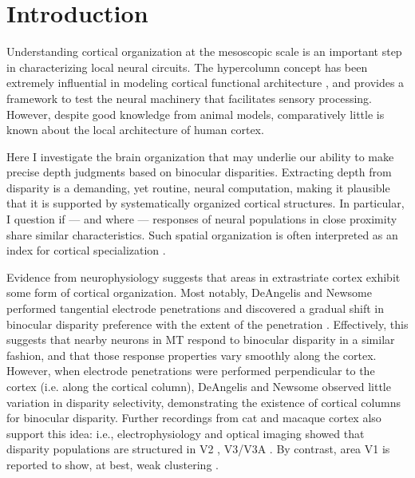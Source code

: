\section{Introduction}

Understanding cortical organization at the mesoscopic scale is an important step in characterizing local neural circuits. The hypercolumn concept \cite{Hubel:1974sv} has been extremely influential in modeling cortical functional architecture \cite{Tso:2009tg}, and provides a framework to test the neural machinery that facilitates sensory processing. However, despite good knowledge from animal models, comparatively little is known about the local architecture of human cortex. 

Here I investigate the brain organization that may underlie our ability to make precise depth judgments based on binocular disparities. Extracting depth from disparity is a demanding, yet routine, neural computation, making it plausible that it is supported by systematically organized cortical structures. In particular, I question if --- and where --- responses of neural populations in close proximity share similar characteristics. Such spatial organization is often interpreted as an index for cortical specialization \cite{DeAngelis:1999fk, Chen:2008vn}.

Evidence from neurophysiology suggests that areas in extrastriate cortex exhibit some form of cortical organization. Most notably, DeAngelis and Newsome performed tangential electrode penetrations and discovered a gradual shift in binocular disparity preference with the extent of the penetration \cite{DeAngelis:1999fk}. Effectively, this suggests that nearby neurons in MT respond to binocular disparity in a similar fashion, and that those response properties vary smoothly along the cortex. However, when electrode penetrations were performed perpendicular to the cortex (i.e. along the cortical column), DeAngelis and Newsome observed little variation in disparity selectivity, demonstrating the existence of cortical columns for binocular disparity. Further recordings from cat and macaque cortex also support this idea: i.e., electrophysiology and optical imaging showed that disparity populations are structured in V2 \cite{Hubel:1987ly,Roe:1995ys,Tso:2001zr,Chen:2008vn,Kara:2009fk}, V3/V3A \cite{Adams:2001wt,Anzai:2011gb,Yeagle_Lafer-Sousa_Conway_2013}. By contrast, area V1 is reported to show, at best, weak clustering \cite{LeVay:1988ve,Prince:2002cr}.

